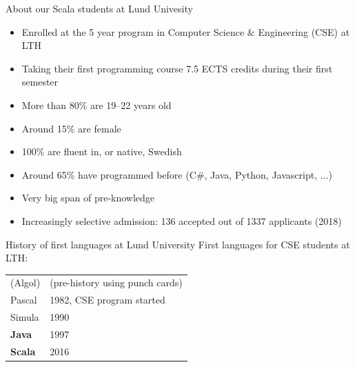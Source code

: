 \documentclass[aspectratio=169]{beamer}
\newenvironment{Slide}[1]%
  {\begin{frame}[environment=Slide]{#1}}
  {\end{frame}}%
\begin{document}
\begin{frame}[plain]
  \begin{figure}
  \centering
  \end{figure}%
  \end{frame}%

\begin{Slide}{About our Scala students at Lund Univesity}
\begin{itemize}
\item Enrolled at the 5 year program in Computer Science \& Engineering (CSE) at LTH
\item Taking their first programming course 7.5 ECTS credits during their first semester
\item More than 80\% are 19--22 years old
\item Around 15\% are female     
\item 100\% are fluent in, or native, Swedish
\item Around 65\% have programmed before (C\#, Java, Python, Javascript, ...)
\item Very big span of pre-knowledge
\item Increasingly selective admission: 136 accepted out of 1337 applicants (2018)
\end{itemize}
\end{Slide}

\begin{Slide}{History of first languages at Lund University}
First languages for CSE students at LTH:
\begin{table}
\begin{tabular}{l l}
(Algol) & (pre-history using punch cards) \\
 Pascal & 1982, CSE program started\\
 Simula &  1990 \\
 {\color{blue}\textbf{Java}} &  1997 \\
 {\color{red}\textbf{Scala}} &  2016 \\
\end{tabular}
\end{table}

\end{Slide}
\end{document}
